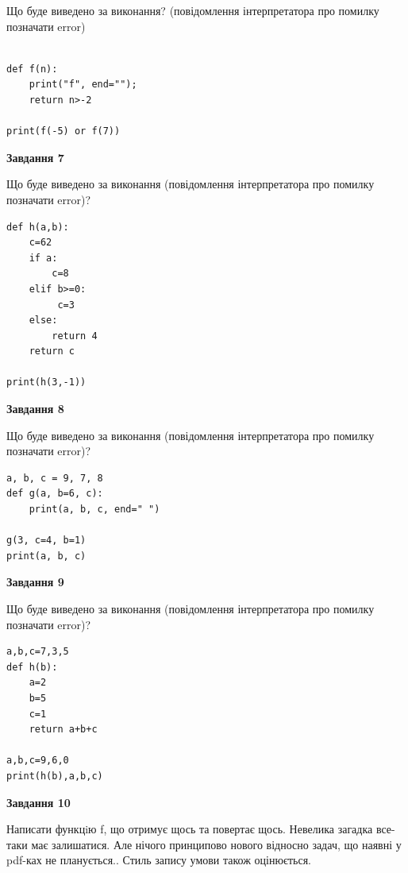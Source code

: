 \documentclass[12pt, ukrainian]{article}
\begin{document}
{\begin {large}
Що буде виведено за виконання? (повідомлення інтерпретатора про помилку позначати error)\par
\begin{verbatim}

def f(n):
    print("f", end="");
    return n>-2

print(f(-5) or f(7))
\end{verbatim}

{\begin {center}\textbf{Завдання 7}\end {center}}

Що буде виведено за виконання (повідомлення інтерпретатора про помилку позначати error)?\par
\begin{verbatim}
def h(a,b):
    c=62
    if a:
        c=8
    elif b>=0:
         c=3
    else: 
        return 4
    return c

print(h(3,-1))
\end{verbatim}

{\begin {center}\textbf{Завдання 8}\end {center}}

Що буде виведено за виконання (повідомлення інтерпретатора про помилку позначати error)?\par
\begin{verbatim}
a, b, c = 9, 7, 8
def g(a, b=6, c):
    print(a, b, c, end=" ")

g(3, c=4, b=1)
print(a, b, c)
\end{verbatim}

{\begin {center}\textbf{Завдання 9}\end {center}}

Що буде виведено за виконання (повідомлення інтерпретатора про помилку позначати error)?\par
\begin{verbatim}
a,b,c=7,3,5
def h(b):
    a=2
    b=5
    c=1
    return a+b+c

a,b,c=9,6,0
print(h(b),a,b,c)
\end{verbatim}

{\begin {center}\textbf{Завдання 10}\end {center}}


Написати функцiю f, що отримує щось та повертає щось. Невелика загадка все-таки має залишатися. Але нічого принципово нового відносно задач, що наявні у pdf-ках не планується.. Стиль запису умови також оцінюється.\par
\end {large}}
\newpage
\end{document}

